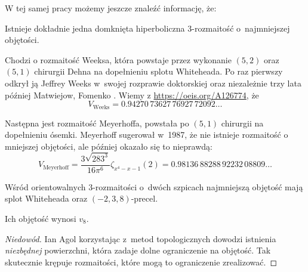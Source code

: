 W tej samej pracy możemy jeszcze znaleźć informację, że:

\begin{proposition}
    Istnieje dokładnie jedna domknięta hiperboliczna 3-rozmaitość o~najmniejszej objętości.
\end{proposition}

Chodzi o rozmaitość Weeksa, która powstaje przez wykonanie $(5, 2)$ oraz $(5, 1)$ chirurgii Dehna na dopełnieniu splotu Whiteheada.
%
%
%
Po raz pierwszy odkrył ją Jeffrey Weeks \cite{weeks1985} w~swojej rozprawie doktorskiej oraz niezależnie trzy lata później Matwiejow, Fomenko \cite{fomenko1988}.
%
%
%
Wiemy z \url{https://oeis.org/A126774}, że
\begin{equation}
    V_{\textrm{Weeks}} = 0.94270 \, 73627 \, 76927 \, 72092 \ldots
\end{equation}

Następna jest rozmaitość Meyerhoffa, powstała po $(5, 1)$ chirurgii na dopełnieniu ósemki.
%
Meyerhoff sugerował w~1987, że nie istnieje rozmaitość o mniejszej objętości, ale później okazało się to nieprawdą: 
\begin{equation}
    V_{\textrm{Meyerhoff}} = \frac{ 3 \sqrt{283^3} } {16 \pi^6} \zeta_{x^4-x-1}(2) = 0.98136 \, 88288 \, 92232 \, 08809 \ldots
\end{equation}

\begin{proposition}
    Wśród orientowalnych 3-rozmaitości o~dwóch szpicach najmniejszą objętość mają splot Whiteheada oraz $(-2, 3, 8)$-precel.
%
%
%
\end{proposition}


Ich objętość wynosi $v_8$.

\begin{proof}[Niedowód]
%
    Ian Agol \cite{agol2010} korzystając z~metod topologicznych dowodzi istnienia \emph{niezbędnej} powierzchni, która zadaje dolne ograniczenie na objętość.
    Tak skutecznie krępuje rozmaitości, które mogą to ograniczenie zrealizować.
\end{proof}


